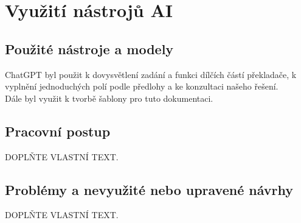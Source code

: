 \documentclass[10pt,a4paper]{article}
\begin{document}
\section{Využití nástrojů AI}

\subsection{Použité nástroje a modely}
ChatGPT byl použit k dovysvětlení zadání a funkci dílčích částí překladače, k vyplnění jednoduchých polí podle předlohy a ke konzultaci našeho řešení. \\
Dále byl využit k tvorbě šablony pro tuto dokumentaci.

\subsection{Pracovní postup}
DOPLŇTE VLASTNÍ TEXT.

\subsection{Problémy a nevyužité nebo upravené návrhy}
DOPLŇTE VLASTNÍ TEXT.
\end{document}
